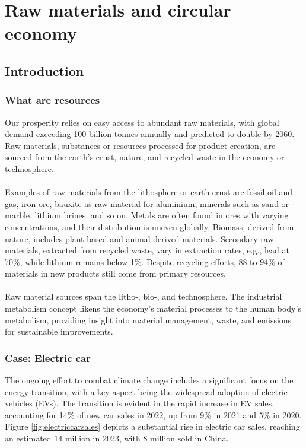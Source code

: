 \documentclass[../summary.tex]{subfiles}
\begin{document}
\section{Raw materials and circular economy}
\subsection{Introduction}	
\subsubsection{What are resources}
	
Our prosperity relies on easy access to abundant raw materials, with global demand exceeding 100 billion tonnes annually and predicted to double by 2060. Raw materials, substances or resources processed for product creation, are sourced from the earth's crust, nature, and recycled waste in the economy or technosphere. \\
\\
Examples of raw materials from the lithosphere or earth crust are fossil oil and gas, iron ore, bauxite as raw material for aluminium, minerals such as sand or marble, lithium brines, and so on. Metals are often found in ores with varying concentrations, and their distribution is uneven globally. Biomass, derived from nature, includes plant-based and animal-derived materials. Secondary raw materials, extracted from recycled waste, vary in extraction rates, e.g., lead at 70\%, while lithium remains below 1\%. Despite recycling efforts, 88 to 94\% of materials in new products still come from primary resources. \\
\\
Raw material sources span the litho-, bio-, and technosphere. The industrial metabolism concept likens the economy's material processes to the human body's metabolism, providing insight into material management, waste, and emissions for sustainable improvements.

\subsubsection{Case: Electric car}

The ongoing effort to combat climate change includes a significant focus on the energy transition, with a key aspect being the widespread adoption of electric vehicles (EVs). The transition is evident in the rapid increase in EV sales, accounting for 14\% of new car sales in 2022, up from 9\% in 2021 and 5\% in 2020. Figure \ref{fig:electriccarsales} depicts a substantial rise in electric car sales, reaching an estimated 14 million in 2023, with 8 million sold in China.
\end{document}
